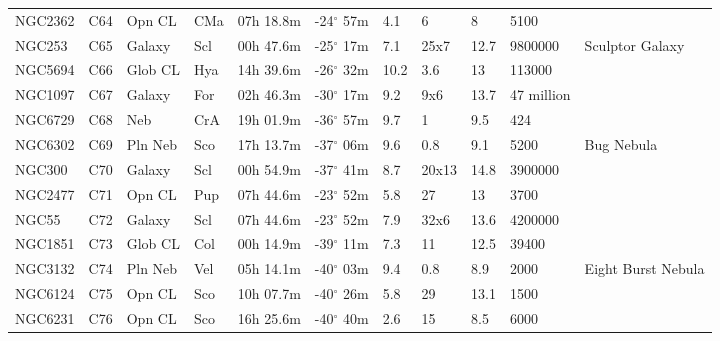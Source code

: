 \documentclass[10pt,twoside,a4paper,english]{article}
\begin{document}
\begin{longtable}{@{}lllllllllll@{}}
NGC2362    & C64           & Opn CL  & CMa & 07h 18.8m & -24$^{\circ}$ 57m & 4.1  & 6              & 8    & 5100          &                                 \\ 
NGC253     & C65           & Galaxy  & Scl & 00h 47.6m & -25$^{\circ}$ 17m & 7.1  & 25x7           & 12.7 & 9800000       & Sculptor Galaxy                 \\ 
NGC5694    & C66           & Glob CL & Hya & 14h 39.6m & -26$^{\circ}$ 32m & 10.2 & 3.6            & 13   & 113000        &                                 \\ 
NGC1097    & C67           & Galaxy  & For & 02h 46.3m & -30$^{\circ}$ 17m & 9.2  & 9x6            & 13.7 & 47 million    &                                 \\ 
NGC6729    & C68           & Neb     & CrA & 19h 01.9m & -36$^{\circ}$ 57m & 9.7  & 1              & 9.5  & 424           &                                 \\ 
NGC6302    & C69           & Pln Neb & Sco & 17h 13.7m & -37$^{\circ}$ 06m & 9.6  & 0.8            & 9.1  & 5200          & Bug Nebula                      \\ 
NGC300     & C70           & Galaxy  & Scl & 00h 54.9m & -37$^{\circ}$ 41m & 8.7  & 20x13          & 14.8 & 3900000       &                                 \\ 
NGC2477    & C71           & Opn CL  & Pup & 07h 44.6m & -23$^{\circ}$ 52m & 5.8  & 27             & 13   & 3700          &                                 \\ 
NGC55      & C72           & Galaxy  & Scl & 07h 44.6m & -23$^{\circ}$ 52m & 7.9  & 32x6           & 13.6 & 4200000       &                                 \\ 
NGC1851    & C73           & Glob CL & Col & 00h 14.9m & -39$^{\circ}$ 11m & 7.3  & 11             & 12.5 & 39400         &                                 \\ 
NGC3132    & C74           & Pln Neb & Vel & 05h 14.1m & -40$^{\circ}$ 03m & 9.4  & 0.8            & 8.9  & 2000          & Eight Burst Nebula              \\ 
NGC6124    & C75           & Opn CL  & Sco & 10h 07.7m & -40$^{\circ}$ 26m & 5.8  & 29             & 13.1 & 1500          &                                 \\ 
NGC6231    & C76           & Opn CL  & Sco & 16h 25.6m & -40$^{\circ}$ 40m & 2.6  & 15             & 8.5  & 6000          &                                 \\ 

\end{longtable}
\end{document}
